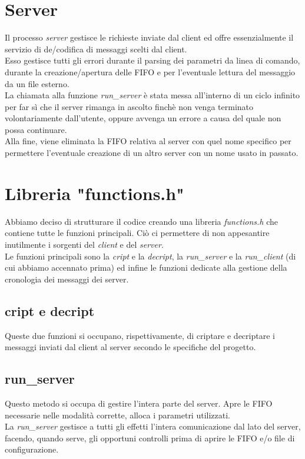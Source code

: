 \documentclass[a4paper,9pt]{article}
\begin{document}
\section{Server}
Il processo \emph{server} gestisce le richieste inviate dal client ed offre essenzialmente il servizio di de/codifica di messaggi scelti dal client.\\
Esso gestisce tutti gli errori durante il parsing dei parametri da linea di comando, durante la creazione/apertura delle FIFO e per l'eventuale lettura del messaggio da un file esterno.\\
La chiamata alla funzione \emph{run\_server} è stata messa all'interno di un ciclo infinito per far sì che il server rimanga in ascolto finchè non venga terminato volontariamente dall'utente, oppure avvenga un errore a causa del quale non possa continuare.\\
Alla fine, viene eliminata la FIFO relativa al server con quel nome specifico per permettere l'eventuale creazione di un altro server con un nome usato in passato.

\section{Libreria "functions.h"}
Abbiamo deciso di strutturare il codice creando una libreria \emph{functions.h} che contiene tutte le funzioni principali. Ciò ci permettere di non appesantire inutilmente i sorgenti del \emph{client} e del \emph{server}.\\
Le funzioni principali sono la \emph{cript} e la \emph{decript}, la \emph{run\_server} e la \emph{run\_client} (di cui abbiamo accennato prima) ed infine le funzioni dedicate alla gestione della cronologia dei messaggi dei server.
\subsection{cript e decript}
Queste due funzioni si occupano, rispettivamente, di criptare e decriptare i messaggi inviati dal client al server secondo le specifiche del progetto.
\subsection{run\_server}
Questo metodo si occupa di gestire l'intera parte del server. Apre le FIFO necessarie nelle modalità corrette, alloca i parametri utilizzati.\\ 
La \emph{run\_server} gestisce a tutti gli effetti l'intera comunicazione dal lato del server, facendo, quando serve, gli opportuni controlli prima di aprire le FIFO e/o file di configurazione.
\end{document}
